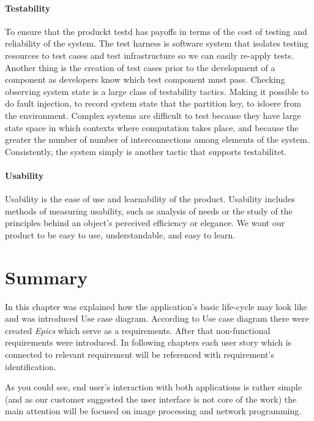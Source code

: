 \paragraph{Testability}

To ensure that the produckt testd has payoffs in terms of the cost of testing and reliability of the system. The test harness is software system that isolates testing resources to test cases and test infrastructure so we can easily re-apply tests. Another thing is the creation of test cases prior to the development of a component as developers know which test component must pass. Checking observing system state is a large class of testability tactics. Making it possible to do fault injection, to record system state that the partition key, to isloere from the environment. Complex systems are difficult to test because they have large state space in which contexts where computation takes place, and because the greater the number of number of interconnections among elements of the system. Consistently, the system simply is another tactic that supports testabilitet.

\paragraph{Usability}
Usability is the ease of use and learnability of the product.
Usability includes methods of measuring usability, such as analysis of needs or the study of the principles behind an object's perceived efficiency or elegance. We want our product to be easy to use, understandable, and easy to learn.  

\section{Summary}
In this chapter was explained how the application's basic life-cycle may look like and was introduced Use case diagram.
According to Use case diagram there were created \emph{Epics} which serve as a requirements. 
After that non-functional requirements were introduced.
In following chapters each user story which is connected to relevant requirement will be referenced with requirement's identification.

As you could see, end user's interaction with both applications is rather simple (and as our customer suggested the user interface is not core of the work) the main attention will be focused on image processing and network programming.

